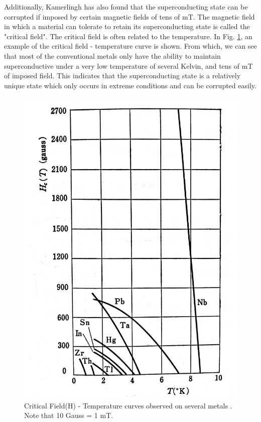 Additionally, Kamerlingh has also found that the superconducting state can be corrupted if imposed by certain magnetic fields of tens of mT. The magnetic field in which a material can tolerate to retain its superconducting state is called the "critical field".
The critical field is often related to the temperature.
In Fig. \ref{fig:H-T}, an example of the critical field - temperature curve is shown.
From which, we can see that most of the conventional metals only have the ability to maintain superconductive under a very low temperature of several Kelvin, and tens of mT of imposed field.
This indicates that the superconducting state is a relatively unique state which only occurs in extreme conditions and can be corrupted easily.
\begin{figure}[H]
  \includegraphics[width=15cm, bb=9 9 900 900]{./section2Proposal/H-T.pdf}
  \caption{Critical Field(H) - Temperature curves observed on several metals \cite{2_3}. Note that 10 Gauss = 1 mT.}
  \label{fig:H-T}
\end{figure}

